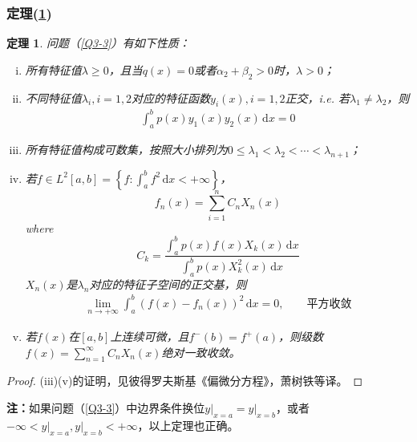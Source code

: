 \documentclass[11pt, a4paper]{article}
\theoremstyle{theorem}
\newtheorem{thm}{定理}[section]
\newcommand{\intd}[1]{\,\mathrm{d}{#1}}
\begin{document}
\subsubsection{定理(\ref{thm-character})}

\begin{thm}
\label{thm-character}
问题（\ref{Q3-3}）有如下性质：
\begin{enumerate}[(i)]
    \item 所有特征值$\lambda \geq 0$，且当$q(x) = 0$或者$\alpha_2 + \beta_2 > 0$时，$\lambda > 0$；
    \item 不同特征值$\lambda_i, i = 1,2$对应的特征函数$y_i(x), i = 1,2$正交，i.e. 若$\lambda_1 \neq \lambda_2$，则
    \begin{align}
        \int_a^b p(x)y_1(x)y_2(x) \intd x = 0
    \end{align}

    \item 所有特征值构成可数集，按照大小排列为$0 \leq \lambda_1 < \lambda_2 < \cdots < \lambda_{n+1}$；

    \item 若$f \in L^2[a,b] = \left\{f: \int_a^b f^2 \intd x < + \infty\right\}$，
    $$
    f_n(x) = \sum_{i=1}^n C_n X_n(x)
    $$
    where
    $$
    C_k = \frac{\int_a^b p(x) f(x) X_k(x) \intd x}{\int_a^b p(x) X_k^2(x) \intd x}
    $$
    $X_n(x)$是$\lambda_n$对应的特征子空间的正交基，则
    \begin{align}
        \lim\limits_{n \rightarrow + \infty} \int_a^b (f(x) - f_n(x))^2 \intd x = 0, \quad \quad \text{平方收敛}
     \end{align}

     \item 若$f(x)$在$[a,b]$上连续可微，且$f^-(b) = f^+(a)$，则级数$f(x) = \sum_{n=1}^\infty C_n X_n (x)$绝对一致收敛。
\end{enumerate}
\end{thm}

\begin{proof}
(iii)(v)的证明，见彼得罗夫斯基《偏微分方程》，萧树铁等译。
\end{proof}

\textbf{注：}如果问题（\ref{Q3-3}）中边界条件换位$y \bigg|_{x=a} = y \bigg|_{x = b} $，或者$- \infty < y \bigg|_{x = a}, y \bigg|_{x=b} < + \infty$，以上定理也正确。
\end{document}
